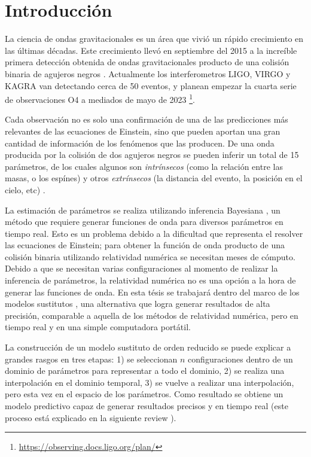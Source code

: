 \chapter{Introducción}

La ciencia de ondas gravitacionales es un área que vivió un rápido crecimiento en las últimas décadas. Este crecimiento llevó en septiembre del 2015 a la increíble primera detección obtenida de ondas gravitacionales producto de una colisión binaria de agujeros negros \cite{https://doi.org/10.48550/arxiv.1607.05251, LIGOScientific:2016aoc}. Actualmente los interferometros LIGO, VIRGO y KAGRA van detectando cerca de 50 eventos, y planean empezar la cuarta serie de observaciones O4 a mediados de mayo de 2023 \footnote{\url{https://observing.docs.ligo.org/plan/}}. 

Cada observación no es solo una confirmación de una de las predicciones más relevantes de las ecuaciones de Einstein, sino que pueden aportan una gran cantidad de información de los fenómenos que las producen. De una onda producida por la colisión de dos agujeros negros se pueden inferir un total de 15 parámetros, de los cuales algunos son \textit{intrínsecos} (como la relación entre las masas, o los espínes) y otros \textit{extrínsecos} (la distancia del evento, la posición en el cielo, etc) \cite{Veitch_2015}. 

La estimación de parámetros se realiza utilizando inferencia Bayesiana \cite{Thrane_2019}, un método que requiere generar funciones de onda para diversos parámetros en tiempo real. Esto es un problema debido a la dificultad que representa el resolver las ecuaciones de Einstein; para obtener la función de onda producto de una colisión binaria utilizando relatividad numérica se necesitan meses de cómputo. Debido a que se necesitan varias configuraciones al momento de realizar la inferencia de parámetros, la relatividad numérica no es una opción a la hora de generar las funciones de onda. En esta tésis se trabajará dentro del marco de los modelos sustitutos \cite{Field_2014}, una alternativa que logra generar resultados de alta precisión, comparable a aquella de los métodos de relatividad numérica, pero en tiempo real y en una simple computadora portátil.

La construcción de un modelo sustituto de orden reducido se puede explicar a grandes rasgos en tres etapas: 1) se seleccionan $n$ configuraciones dentro de un dominio de parámetros para representar a todo el dominio, 2) se realiza una interpolación en el dominio temporal, 3) se vuelve a realizar una interpolación, pero esta vez en el espacio de los parámetros. Como resultado se obtiene un modelo predictivo capaz de generar resultados precisos y en tiempo real (este proceso está explicado en la siguiente review \cite{Tiglio:2021ysj}).

